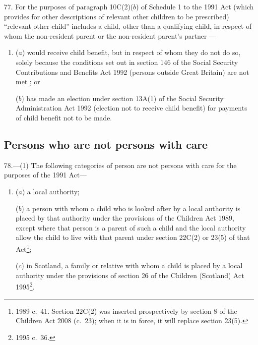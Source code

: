 \documentclass[12pt,a4paper]{article}
\begin{document}
77.  For the purposes of paragraph 10C(2)($b$)  of Schedule 1 to the 1991 Act (which provides for other descriptions of relevant other children to be prescribed) “relevant other child” includes a child, other than a qualifying child, in respect of whom the non-resident parent or the non-resident parent’s partner%
---
\begin{enumerate}\item[]
($a$)  %
 would receive child benefit, but in respect of whom they do not do so, solely because the conditions set out in section 146 of the Social Security Contributions and Benefits Act 1992 (persons outside Great Britain) are not met%
; or

($b$) has made an election under section 13A(1) of the Social Security Administration Act 1992 (election not to receive child benefit) for payments of child benefit not to be made.
\end{enumerate}


\subsection[78. Persons who are not persons with care]{Persons who are not persons with care}

78.---(1)  The following categories of person are not persons with care for the purposes of the 1991 Act—
\begin{enumerate}\item[]
($a$) a local authority;

($b$) a person with whom a child who is looked after by a local authority is placed by that authority under the provisions of the Children Act 1989, except where that person is a parent of such a child and the local authority allow the child to live with that parent under section 22C(2) or 23(5) of that Act\footnote{1989 c.~41. Section 22C(2) was inserted prospectively by section 8 of the Children Act 2008 (c.~23); when it is in force, it will replace section 23(5).};

($c$) in Scotland, a family or relative with whom a child is placed by a local authority under the provisions of section 26 of the Children (Scotland) Act 1995\footnote{1995 c.~36.}.
\end{enumerate}
\end{document}
